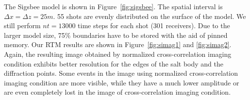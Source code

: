 


The Sigsbee model is shown in Figure~\ref{fig:sigsbee}. The spatial interval is  $\Delta x=\Delta z=25m$. 55 shots are evenly distributed on the surface of the model. We still perform $nt=13000$ time steps for each shot (301 receivers). Due to the larger model size, 75\% boundaries have to be stored with the aid of pinned memory. Our RTM results are shown in Figure~\ref{fig:simag1} and \ref{fig:simag2}. Again, the resulting image obtained by normalized cross-correlation imaging condition exhibits better resolution for the edges of the salt body and the diffraction points. Some events in the image using normalized cross-correlation imaging condition are more visible, while they have a much lower amplitude or are even completely lost in the image of cross-correlation imaging condition.


% 
% 
% 
% 
% 






